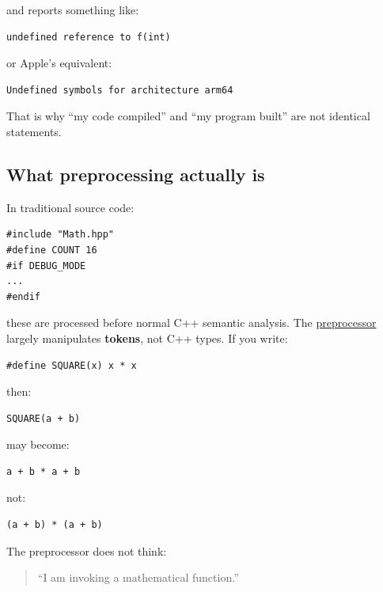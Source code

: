 and reports something like:

\begin{verbatim}
undefined reference to f(int)
\end{verbatim}

or Apple's equivalent:

\begin{verbatim}
Undefined symbols for architecture arm64
\end{verbatim}

That is why ``my code compiled'' and ``my program built'' are not identical statements.

\subsection{What preprocessing actually is}\label{01-foundations-i-ch002-what-preprocessing-actually-is}

\hypertarget{01-foundations-i-ch002-what-preprocessing-actually-is}{}

In traditional source code:

\begin{verbatim}
#include "Math.hpp"
#define COUNT 16
#if DEBUG_MODE
...
#endif
\end{verbatim}

these are processed before normal C++ semantic analysis. The \hyperref[appendix-33c0a92ce855]{preprocessor} largely manipulates \textbf{tokens}, not C++ types. If you write:

\begin{verbatim}
#define SQUARE(x) x * x
\end{verbatim}

then:

\begin{verbatim}
SQUARE(a + b)
\end{verbatim}

may become:

\begin{verbatim}
a + b * a + b
\end{verbatim}

not:

\begin{verbatim}
(a + b) * (a + b)
\end{verbatim}

The preprocessor does not think:

\begin{quote}
``I am invoking a mathematical function.''
\end{quote}

